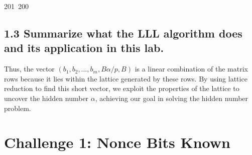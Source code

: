 201~200~\documentclass{article}
\begin{document}
	                                                                        	                                                                    	                                	                    	                    	                        	                        	                    	                                                                	                	                                                                    	                    \subsection{1.3 Summarize what the LLL algorithm does and its application in this lab.}

	                                                                        	                                                                    	                                	                    	                    	                        	                        	                    	                                                                	                	                                                                    	                    Thus, the vector \((b_1, b_2, \ldots, b_m, B\alpha/p, B)\) is a linear combination of the matrix rows because it lies within the lattice generated by these rows. By using lattice reduction to find this short vector, we exploit the properties of the lattice to uncover the hidden number \(\alpha\), achieving our goal in solving the hidden number problem.

	                                                                        	                                                                    	                                	                    	                    	                        	                        	                    	                                                                	                	                                                                    	                    \section{Challenge 1: Nonce Bits Known}
\end{document}
